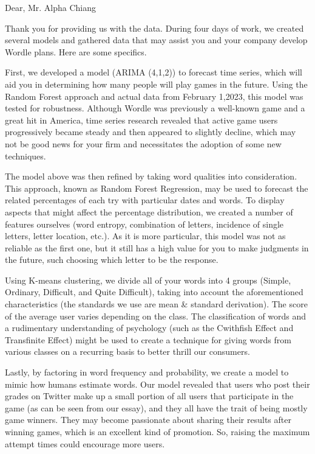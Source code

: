 \documentclass{mcmthesis}
\begin{document}
\begin{letter}{Dear, Mr. Alpha Chiang}

\hspace*{0.6cm}Thank you for providing us with the data. During four days of work, we created several models and gathered data that may assist you and your company develop Wordle plans. Here are some specifics.

\hspace*{0.6cm}First, we developed a model (ARIMA (4,1,2)) to forecast time series, which will aid you in determining how many people will play games in the future. Using the Random Forest approach and actual data from February 1,2023, this model was tested for robustness. Although Wordle was previously a well-known game and a great hit in America, time series research revealed that active game users progressively became steady and then appeared to slightly decline, which may not be good news for your firm and necessitates the adoption of some new techniques.
	
\hspace*{0.6cm}The model above was then refined by taking word qualities into consideration. This approach, known as Random Forest Regression, may be used to forecast the related percentages of each try with particular dates and words. To display aspects that might affect the percentage distribution, we created a number of features ourselves (word entropy, combination of letters, incidence of single letters, letter location, etc.). As it is more particular, this model was not as reliable as the first one, but it still has a high value for you to make judgments in the future, such choosing which letter to be the response.
	
\hspace*{0.6cm}Using K-means clustering, we divide all of your words into 4 groups (Simple, Ordinary, Difficult, and Quite Difficult), taking into account the aforementioned characteristics (the standards we use are mean & standard derivation). The score of the average user varies depending on the class. The classification of words and a rudimentary understanding of psychology (such as the Cwithfish Effect and Transfinite Effect) might be used to create a technique for giving words from various classes on a recurring basis to better thrill our consumers.
	
\hspace*{0.6cm}Lastly, by factoring in word frequency and probability, we create a model to mimic how humans estimate words. Our model revealed that users who post their grades on Twitter make up a small portion of all users that participate in the game (as can be seen from our essay), and they all have the trait of being mostly game winners. They may become passionate about sharing their results after winning games, which is an excellent kind of promotion. So, raising the maximum attempt times could encourage more users.


\end{letter}
\end{document}
